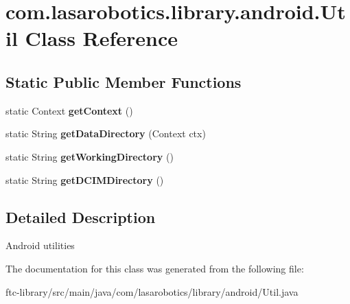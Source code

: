 \hypertarget{classcom_1_1lasarobotics_1_1library_1_1android_1_1_util}{}\section{com.\+lasarobotics.\+library.\+android.\+Util Class Reference}
\label{classcom_1_1lasarobotics_1_1library_1_1android_1_1_util}
\subsection*{Static Public Member Functions}
\begin{DoxyCompactItemize}
\item 
\hypertarget{classcom_1_1lasarobotics_1_1library_1_1android_1_1_util_a0007ba69145e773b1ab87e0a2f300ecd}{}static Context {\bfseries get\+Context} ()\label{classcom_1_1lasarobotics_1_1library_1_1android_1_1_util_a0007ba69145e773b1ab87e0a2f300ecd}

\item 
\hypertarget{classcom_1_1lasarobotics_1_1library_1_1android_1_1_util_aa33c0a14e78d27a0666b13213d5c2c88}{}static String {\bfseries get\+Data\+Directory} (Context ctx)\label{classcom_1_1lasarobotics_1_1library_1_1android_1_1_util_aa33c0a14e78d27a0666b13213d5c2c88}

\item 
\hypertarget{classcom_1_1lasarobotics_1_1library_1_1android_1_1_util_abc11fac355184bbdb863349196d1052f}{}static String {\bfseries get\+Working\+Directory} ()\label{classcom_1_1lasarobotics_1_1library_1_1android_1_1_util_abc11fac355184bbdb863349196d1052f}

\item 
\hypertarget{classcom_1_1lasarobotics_1_1library_1_1android_1_1_util_a397779d60d1bb312de3999d3c7d4d900}{}static String {\bfseries get\+D\+C\+I\+M\+Directory} ()\label{classcom_1_1lasarobotics_1_1library_1_1android_1_1_util_a397779d60d1bb312de3999d3c7d4d900}

\end{DoxyCompactItemize}


\subsection{Detailed Description}
Android utilities 

The documentation for this class was generated from the following file\+:\begin{DoxyCompactItemize}
\item 
ftc-\/library/src/main/java/com/lasarobotics/library/android/Util.\+java\end{DoxyCompactItemize}
